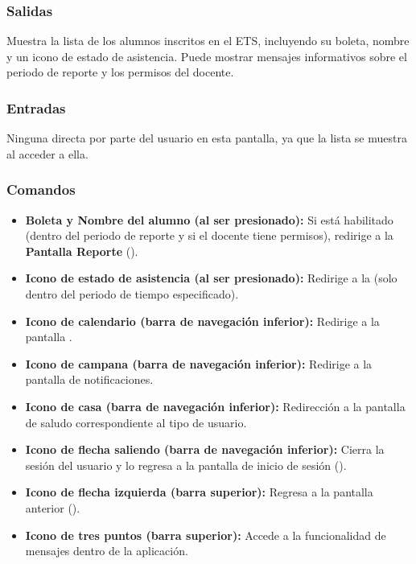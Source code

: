 \subsubsection{Salidas}
Muestra la lista de los alumnos inscritos en el ETS, incluyendo su boleta, nombre y un icono de estado de asistencia. Puede mostrar mensajes informativos sobre el periodo de reporte y los permisos del docente.

\subsubsection{Entradas}
Ninguna directa por parte del usuario en esta pantalla, ya que la lista se muestra al acceder a ella.

\subsubsection{Comandos}
\begin{itemize}
	\item \textbf{Boleta y Nombre del alumno (al ser presionado):} Si está habilitado (dentro del periodo de reporte y si el docente tiene permisos), redirige a la \textbf{Pantalla Reporte} ().
	\item \textbf{Icono de estado de asistencia (al ser presionado):} Redirige a la  (solo dentro del periodo de tiempo especificado).
	\item \textbf{Icono de calendario (barra de navegación inferior):} Redirige a la pantalla .
	\item \textbf{Icono de campana (barra de navegación inferior):} Redirige a la pantalla de notificaciones.
	\item \textbf{Icono de casa (barra de navegación inferior):} Redirección a la pantalla de saludo correspondiente al tipo de usuario.
	\item \textbf{Icono de flecha saliendo (barra de navegación inferior):} Cierra la sesión del usuario y lo regresa a la pantalla de inicio de sesión ().
	\item \textbf{Icono de flecha izquierda (barra superior):} Regresa a la pantalla anterior ().
	\item \textbf{Icono de tres puntos (barra superior):} Accede a la funcionalidad de mensajes dentro de la aplicación.
\end{itemize}


